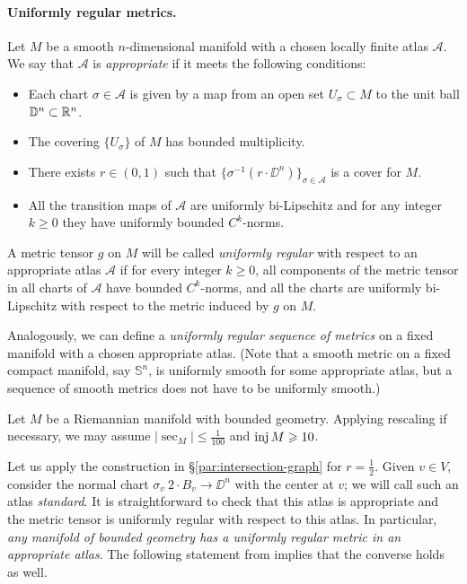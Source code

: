 \arxiv{\documentclass[a4paper,10pt]{article}}{\documentclass{mjm}}
\begin{document}
\paragraph{Uniformly regular metrics.}
\label{par:uniformly-regular}
Let $M$ be a smooth $n$-dimensional manifold with a chosen locally finite atlas $\mathcal{A}$.
We say that $\mathcal{A}$ is \emph{appropriate} if it meets the following conditions:
\begin{itemize}
\item Each chart $\sigma\in \mathcal{A}$ is given by a map from an open set $U_\sigma\subset M$ to the unit ball $\mathbb{D}^n\subset \mathbb{R}^n$.
\item The covering $\{U_\sigma\}$ of $M$ has bounded multiplicity.
\item There exists $r\in (0,1)$ such that $\{\sigma^{-1}(r\cdot \DD^n)\}_{\sigma\in\mathcal{A}}$ is a cover for $M$.
\item All the transition maps of $\mathcal{A}$ are uniformly bi-Lipschitz and for any integer $k\ge 0$ they  have uniformly bounded $C^k$-norms. 
\end{itemize}

A metric tensor $g$ on $M$ will be called \emph{uniformly regular} with respect to an appropriate atlas $\mathcal{A}$
if for every integer $k\ge 0$, all components of the metric tensor in all charts of $\mathcal{A}$ have bounded $C^k$-norms,
and all the charts are uniformly bi-Lipschitz with respect to the metric induced by $g$ on $M$. 

Analogously, we can define a \emph{uniformly regular sequence of metrics} on a fixed manifold with a chosen appropriate atlas.
(Note that a smooth metric on a fixed compact manifold, say $\mathbb{S}^n$, is uniformly smooth for some appropriate atlas,
but a sequence of smooth metrics does not have to be uniformly smooth.)

Let $M$ be a Riemannian manifold with bounded geometry.
Applying rescaling if necessary, we may assume $|\sec_M|\le \tfrac1{100}$ and $\operatorname{\rm inj} M\geqslant 10$.

Let us apply the construction in §\ref{par:intersection-graph} for $r=\tfrac12$.
Given $v\in V$, consider the normal chart $\sigma_v\:2\cdot B_v\to\DD^n$ with the center at $v$;
we will call such an atlas \emph{standard}.
It is straightforward to check that this atlas is appropriate and
the metric tensor is uniformly regular with respect to this atlas.
In particular, \textit{any manifold of bounded geometry has a uniformly regular metric in an appropriate atlas}.
The following statement from \cite{disconzi-shao-simonett} implies that the converse holds as well.
\end{document}
